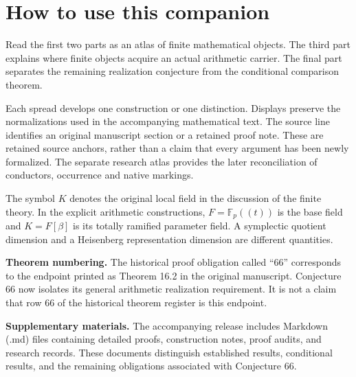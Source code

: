 \documentclass[11pt,letterpaper]{article}
\newcommand\F{\mathbb F}\newcommand\C{\mathbb C}\newcommand\OO{\mathcal O}
\begin{document}
\KomorebiCover
{}

\section*{How to use this companion}
{}
Read the first two parts as an atlas of finite mathematical objects. The third part explains where finite objects acquire an actual arithmetic carrier. The final part separates the remaining realization conjecture from the conditional comparison theorem.

Each spread develops one construction or one distinction. Displays preserve the normalizations used in the accompanying mathematical text. The source line identifies an original manuscript section or a retained proof note. These are retained source anchors, rather than a claim that every argument has been newly formalized. The separate research atlas provides the later reconciliation of conductors, occurrence and native markings.

The symbol $K$ denotes the original local field in the discussion of the finite theory. In the explicit arithmetic constructions, $F=\F_p((t))$ is the base field and $K=F[\beta]$ is its totally ramified parameter field. A symplectic quotient dimension and a Heisenberg representation dimension are different quantities.

\textbf{Theorem numbering.} The historical proof obligation called ``66'' corresponds to the endpoint printed as Theorem 16.2 in the original manuscript. Conjecture 66 now isolates its general arithmetic realization requirement. It is not a claim that row 66 of the historical theorem register is this endpoint.

\textbf{Supplementary materials.} The accompanying release includes Markdown (.md) files containing detailed proofs, construction notes, proof audits, and research records. These documents distinguish established results, conditional results, and the remaining obligations associated with Conjecture 66.
\end{document}
